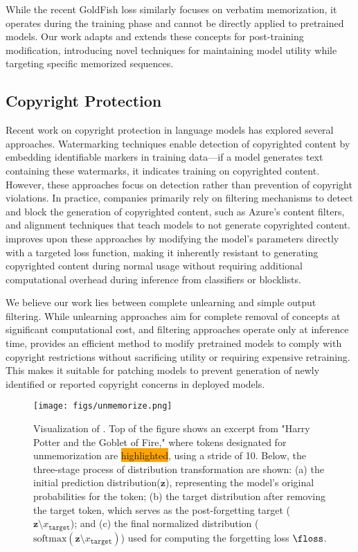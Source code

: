 While the recent GoldFish loss \cite{HWJKKSSSGBG24} similarly focuses on verbatim memorization, it operates during the training phase and cannot be directly applied to pretrained models. Our work adapts and extends these concepts for post-training modification, introducing novel techniques for maintaining model utility while targeting specific memorized sequences.


\subsection{Copyright Protection}
Recent work on copyright protection in language models has explored several approaches. Watermarking techniques \cite{LWWG23,SDSJ20,SFDDF24} enable detection of copyrighted content by embedding identifiable markers in training data—if a model generates text containing these watermarks, it indicates training on copyrighted content. However, these approaches focus on detection rather than prevention of copyright violations.
In practice, companies primarily rely on filtering mechanisms to detect and block the generation of copyrighted content, such as Azure's content filters, and alignment techniques that teach models to not generate copyrighted content. \system{} improves upon these approaches by modifying the model's parameters directly with a targeted loss function, making it inherently resistant to generating copyrighted content during normal usage without requiring additional computational overhead during inference from classifiers or blocklists.

We believe our work lies between complete unlearning and simple output filtering. While unlearning approaches aim for complete removal of concepts at significant computational cost, and filtering approaches operate only at inference time, \system{} provides an efficient method to modify pretrained models to comply with copyright restrictions without sacrificing utility or requiring expensive retraining. This makes it suitable for patching models to prevent generation of newly identified or reported copyright concerns in deployed models.


\begin{figure*}[!t]
\centering
\texttt{[image: figs/unmemorize.png]}
\caption{
Visualization of \system{}. Top of the figure shows an excerpt from "Harry Potter and the Goblet of Fire," where tokens designated for unmemorization are {\colorbox{orange}{highlighted}}, using a stride of 10. Below, the three-stage process of distribution transformation are shown: (a) the initial prediction distribution($\mathbf{z}$), representing the model's original probabilities for the  token; (b) the target distribution after removing the target token, which serves as the post-forgetting target (${\mathbf{z}{\setminus x_\texttt{target}}}$); and (c) the final normalized distribution ($\text{softmax}\left({\mathbf{z}{\setminus x_\texttt{target}}}\right)$) used for computing the forgetting loss $\floss$.
}
\label{fig:mainFig}
\end{figure*}